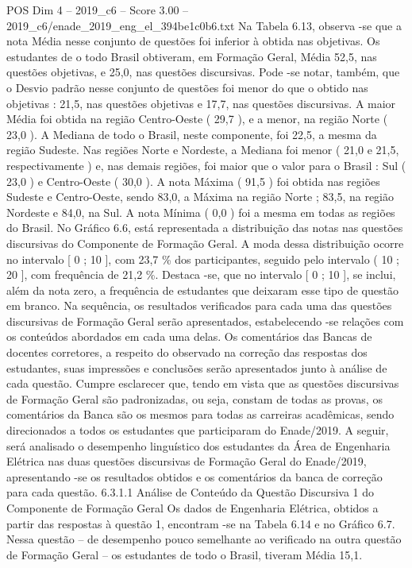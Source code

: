 \begin{textsample}{POS Dim 4 – 2019\_c6 – Score 3.00 – 2019\_c6/enade\_2019\_eng\_el\_394be1c0b6.txt}
Na Tabela 6.13, observa -se que a nota Média nesse conjunto de questões foi inferior à obtida nas objetivas.
Os estudantes de o todo Brasil obtiveram, em Formação Geral, Média 52,5, nas questões objetivas, e 25,0, nas questões discursivas.
Pode -se notar, também, que o Desvio padrão nesse conjunto de questões foi menor do que o obtido nas objetivas : 21,5, nas questões objetivas e 17,7, nas questões discursivas.
A maior Média foi obtida na região Centro-Oeste ( 29,7 ), e a menor, na região Norte ( 23,0 ).
A Mediana de todo o Brasil, neste componente, foi 22,5, a mesma da região Sudeste.
Nas regiões Norte e Nordeste, a Mediana foi menor ( 21,0 e 21,5, respectivamente ) e, nas demais regiões, foi maior que o valor para o Brasil : Sul ( 23,0 ) e Centro-Oeste ( 30,0 ).
A nota Máxima ( 91,5 ) foi obtida nas regiões Sudeste e Centro-Oeste, sendo 83,0, a Máxima na região Norte ; 83,5, na região Nordeste e 84,0, na Sul.
A nota Mínima ( 0,0 ) foi a mesma em todas as regiões do Brasil.
No Gráfico 6.6, está representada a distribuição das notas nas questões discursivas do Componente de Formação Geral.
A moda dessa distribuição ocorre no intervalo [ 0 ; 10 ], com 23,7 \% dos participantes, seguido pelo intervalo ( 10 ; 20 ], com frequência de 21,2 \%.
Destaca -se, que no intervalo [ 0 ; 10 ], se inclui, além da nota zero, a frequência de estudantes que deixaram esse tipo de questão em branco.
Na sequência, os resultados verificados para cada uma das questões discursivas de Formação Geral serão apresentados, estabelecendo -se relações com os conteúdos abordados em cada uma delas.
Os comentários das Bancas de docentes corretores, a respeito do observado na correção das respostas dos estudantes, suas impressões e conclusões serão apresentados junto à análise de cada questão.
Cumpre esclarecer que, tendo em vista que as questões discursivas de Formação Geral são padronizadas, ou seja, constam de todas as provas, os comentários da Banca são os mesmos para todas as carreiras acadêmicas, sendo direcionados a todos os estudantes que participaram do Enade/2019.
A seguir, será analisado o desempenho linguístico dos estudantes da Área de Engenharia Elétrica nas duas questões discursivas de Formação Geral do Enade/2019, apresentando -se os resultados obtidos e os comentários da banca de correção para cada questão. 6.3.1.1 Análise de Conteúdo da Questão Discursiva 1 do Componente de Formação Geral Os dados de Engenharia Elétrica, obtidos a partir das respostas à questão 1, encontram -se na Tabela 6.14 e no Gráfico 6.7.
Nessa questão – de desempenho pouco semelhante ao verificado na outra questão de Formação Geral – os estudantes de todo o Brasil, tiveram Média 15,1.

\end{textsample}
